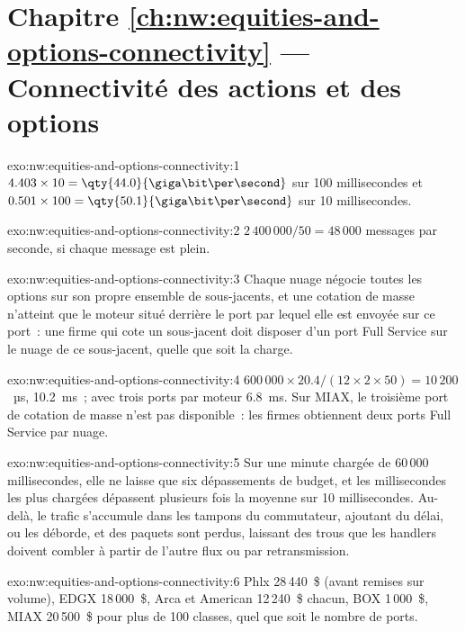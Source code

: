 \section*{Chapitre \ref{ch:nw:equities-and-options-connectivity} --- Connectivité des actions et des options}

\begin{solution}{exo:nw:equities-and-options-connectivity:1}
$4.403 \times 10 = \qty{44.0}{\giga\bit\per\second}$ sur 100 millisecondes et $0.501 \times 100 = \qty{50.1}{\giga\bit\per\second}$ sur
10 millisecondes.
\end{solution}

\begin{solution}{exo:nw:equities-and-options-connectivity:2}
$2\,400\,000/50 = 48\,000$ messages par seconde, si chaque message est plein.
\end{solution}

\begin{solution}{exo:nw:equities-and-options-connectivity:3}
Chaque nuage négocie toutes les options sur son propre ensemble de sous-jacents, et une cotation de masse n'atteint que le moteur situé derrière le port par lequel elle est envoyée
sur ce port~: une firme qui cote un sous-jacent doit disposer d'un port Full Service sur le nuage de ce sous-jacent, quelle que soit la charge.
\end{solution}

\begin{solution}{exo:nw:equities-and-options-connectivity:4}
$600\,000 \times 20.4/(12 \times 2 \times 50) = 10\,200$~µs, \qty{10.2}{\milli\second}~; avec trois ports par moteur
\qty{6.8}{\milli\second}. Sur MIAX, le troisième port de cotation de masse n'est pas disponible~: les firmes obtiennent deux ports Full Service par nuage.
\end{solution}

\begin{solution}{exo:nw:equities-and-options-connectivity:5}
Sur une minute chargée de 60\,000 millisecondes, elle ne laisse que six dépassements de budget, et les millisecondes les plus chargées dépassent plusieurs fois la
moyenne sur 10 millisecondes. Au-delà, le trafic s'accumule dans les tampons du commutateur, ajoutant du délai, ou les déborde, et des paquets sont perdus, laissant des trous
que les handlers doivent combler à partir de l'autre flux ou par retransmission.
\end{solution}

\begin{solution}{exo:nw:equities-and-options-connectivity:6}
Phlx 28\,440~\$ (avant remises sur volume), EDGX 18\,000~\$, Arca et American 12\,240~\$ chacun, BOX 1\,000~\$, MIAX 20\,500~\$ pour plus de 100
classes, quel que soit le nombre de ports.
\end{solution}

